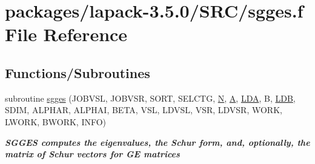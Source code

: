\hypertarget{sgges_8f}{}\section{packages/lapack-\/3.5.0/\+S\+R\+C/sgges.f File Reference}
\label{sgges_8f}
\subsection*{Functions/\+Subroutines}
\begin{DoxyCompactItemize}
\item 
subroutine \hyperlink{group__realGEeigen_ga6a36f16104f3f8ae8e499cc7efaa2195}{sgges} (J\+O\+B\+V\+S\+L, J\+O\+B\+V\+S\+R, S\+O\+R\+T, S\+E\+L\+C\+T\+G, \hyperlink{polmisc_8c_a0240ac851181b84ac374872dc5434ee4}{N}, \hyperlink{classA}{A}, \hyperlink{example__user_8c_ae946da542ce0db94dced19b2ecefd1aa}{L\+D\+A}, B, \hyperlink{example__user_8c_a50e90a7104df172b5a89a06c47fcca04}{L\+D\+B}, S\+D\+I\+M, A\+L\+P\+H\+A\+R, A\+L\+P\+H\+A\+I, B\+E\+T\+A, V\+S\+L, L\+D\+V\+S\+L, V\+S\+R, L\+D\+V\+S\+R, W\+O\+R\+K, L\+W\+O\+R\+K, B\+W\+O\+R\+K, I\+N\+F\+O)
\begin{DoxyCompactList}\small\item\em {\bfseries  S\+G\+G\+E\+S computes the eigenvalues, the Schur form, and, optionally, the matrix of Schur vectors for G\+E matrices} \end{DoxyCompactList}\end{DoxyCompactItemize}
